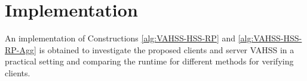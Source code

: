 



\section{Implementation}
\label{sec:implementation}
An implementation of Constructions \ref{alg:VAHSS-HSS-RP} and \ref{alg:VAHSS-HSS-RP-Agg} is obtained to investigate the proposed clients and server VAHSS in a practical setting and comparing the runtime for different methods for verifying clients.


